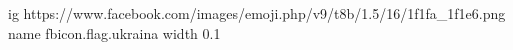  
 
 
 
 
\ifcmt
  ig https://www.facebook.com/images/emoji.php/v9/t8b/1.5/16/1f1fa_1f1e6.png
	name fbicon.flag.ukraina
  width 0.1
\fi
